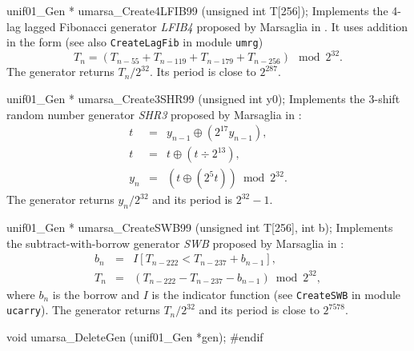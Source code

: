 unif01_Gen * umarsa_Create4LFIB99 (unsigned int T[256]);
\endcode
 \tab Implements the 4-lag lagged Fibonacci generator {\it LFIB4} proposed by
%
   Marsaglia in  \cite{rMAR99a}. It uses addition in the form
   (see also {\tt CreateLagFib} in module  {\tt umrg})
   $$
   T_{n} = (T_{n-55} + T_{n-119} + T_{n-179} + T_{n-256}) \mod 2^{32}.
   $$
   The generator returns $T_{n}/2^{32}$. Its period is close to
   $2^{287}$.
  \endtab
\code


unif01_Gen * umarsa_Create3SHR99 (unsigned int y0);
\endcode
 \tab Implements the 3-shift random number generator {\it SHR3} proposed by
%
  Marsaglia in \cite{rMAR99a}:
  \begin {eqnarray*}
   t &=& y_{n-1}\oplus \left(2^{17} y_{n-1}\right), \\
   t &=& t\oplus \left(t \div 2^{13}\right), \\
   y_{n} &=& \left(t \oplus \left(2^{5} t\right)\right) \bmod 2^{32}.
  \end {eqnarray*}
   The generator returns $y_n/2^{32}$ and its period is $2^{32} -1$.
  \endtab
\code


unif01_Gen * umarsa_CreateSWB99 (unsigned int T[256], int b);
\endcode
 \tab Implements the subtract-with-borrow generator {\it SWB}
%
  proposed by Marsaglia in  \cite{rMAR99a}:
  \begin {eqnarray*}
   b_n &=&  I[T_{n-222} < T_{n-237} + b_{n-1}], \\
   T_{n} &=& \left(T_{n-222} - T_{n-237} - b_{n-1}\right) \bmod 2^{32},
  \end {eqnarray*}
   where $b_n$ is the borrow and $I$ is the indicator function
   (see {\tt CreateSWB} in module  {\tt ucarry}).
  The generator returns $T_{n}/2^{32}$ and its period is close to $2^{7578}$.
  \endtab



\code

void umarsa_DeleteGen (unif01_Gen *gen);
\endcode
 \tab \DelGen
 \endtab
\code
\hide
#endif
\endhide
\endcode
